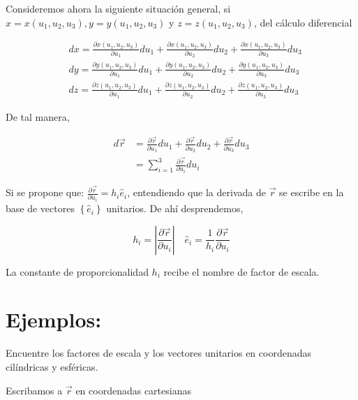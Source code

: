 Consideremos ahora la siguiente situación general, si $x=x\left(u_{1}, u_{2}, u_{3}\right), y=y\left(u_{1}, u_{2}, u_{3}\right)$ y $z=z\left(u_{1}, u_{2}, u_{3}\right)$, del cálculo diferencial

$$
\begin{aligned}
& d x=\frac{\partial x\left(u_{1}, u_{2}, u_{3}\right)}{\partial u_{1}} d u_{1}+\frac{\partial x\left(u_{1}, u_{2}, u_{3}\right)}{\partial u_{2}} d u_{2}+\frac{\partial x\left(u_{1}, u_{2}, u_{3}\right)}{\partial u_{3}} d u_{3} \\
& d y=\frac{\partial y\left(u_{1}, u_{2}, u_{3}\right)}{\partial u_{1}} d u_{1}+\frac{\partial y\left(u_{1}, u_{2}, u_{3}\right)}{\partial u_{2}} d u_{2}+\frac{\partial y\left(u_{1}, u_{2}, u_{3}\right)}{\partial u_{3}} d u_{3} \\
& d z=\frac{\partial z\left(u_{1}, u_{2}, u_{3}\right)}{\partial u_{1}} d u_{1}+\frac{\partial z\left(u_{1}, u_{2}, u_{3}\right)}{\partial u_{2}} d u_{2}+\frac{\partial z\left(u_{1}, u_{2}, u_{3}\right)}{\partial u_{3}} d u_{3}
\end{aligned}
$$

De tal manera,

$$
\begin{aligned}
d \vec{r} & =\frac{\partial \vec{r}}{\partial u_{1}} d u_{1}+\frac{\partial \vec{r}}{\partial u_{2}} d u_{2}+\frac{\partial \vec{r}}{\partial u_{3}} d u_{3} \\
& =\sum_{i=1}^{3} \frac{\partial \vec{r}}{\partial u_{i}} d u_{i}
\end{aligned}
$$

Si se propone que: $\frac{\partial \vec{r}}{\partial u_{i}}=h_{i} \hat{e}_{i}$, entendiendo que la derivada de $\vec{r}$ se escribe en la base de vectores $\left\{\widehat{e}_{i}\right\}$ unitarios. De ahí desprendemos,

$$
h_{i}=\left|\frac{\partial \vec{r}}{\partial u_{i}}\right| \quad \hat{e}_{i}=\frac{1}{h_{i}} \frac{\partial \vec{r}}{\partial u_{i}}
$$

La constante de proporcionalidad $h_{i}$ recibe el nombre de factor de escala.

\section{Ejemplos:}
Encuentre los factores de escala y los vectores unitarios en coordenadas cilíndricas y esféricas.

Escribamos a $\vec{r}$ en coordenadas cartesianas

